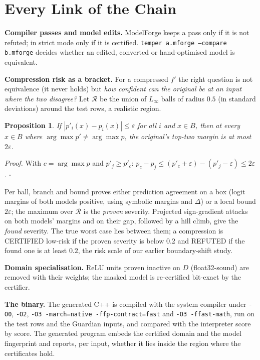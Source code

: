 \documentclass[conference]{IEEEtran}
\newtheorem{proposition}{Proposition}
\begin{document}
\section{Every Link of the Chain}\label{sec:chain}
\textbf{Compiler passes and model edits.} ModelForge keeps a pass only if it is not refuted; in strict mode only if it is certified. \texttt{temper a.mforge --compare b.mforge} decides whether an edited, converted or hand-optimised model is equivalent.

\textbf{Compression risk as a bracket.} For a compressed $f'$ the right question is not equivalence (it never holds) but \emph{how confident can the original be at an input where the two disagree?} Let $\mathcal{R}$ be the union of $L_\infty$ balls of radius $0.5$ (in standard deviations) around the test rows, a realistic region.
\begin{proposition}
If $|p'_i(x)-p_i(x)|\le\varepsilon$ for all $i$ and $x\in B$, then at every $x\in B$ where $\arg\max p'\ne\arg\max p$, the original's top-two margin is at most $2\varepsilon$.
\end{proposition}
\noindent\emph{Proof.} With $c=\arg\max p$ and $p'_j\ge p'_c$: $p_c-p_j\le(p'_c+\varepsilon)-(p'_j-\varepsilon)\le2\varepsilon$. \hfill$\square$

Per ball, branch and bound proves either prediction agreement on a box (logit margins of both models positive, using symbolic margins and $\Delta$) or a local bound $2\varepsilon$; the maximum over $\mathcal{R}$ is the \emph{proven} severity. Projected sign-gradient attacks on both models' margins and on their gap, followed by a hill climb, give the \emph{found} severity. The true worst case lies between them; a compression is CERTIFIED low-risk if the proven severity is below $0.2$ and REFUTED if the found one is at least $0.2$, the risk scale of our earlier boundary-shift study.

\textbf{Domain specialisation.} ReLU units proven inactive on $D$ (float32-sound) are removed with their weights; the masked model is re-certified bit-exact by the certifier.

\textbf{The binary.} The generated C++ is compiled with the system compiler under \texttt{-O0}, \texttt{-O2}, \texttt{-O3 -march=native -ffp-contract=fast} and \texttt{-O3 -ffast-math}, run on the test rows and the Guardian inputs, and compared with the interpreter score by score. The generated program embeds the certified domain and the model fingerprint and reports, per input, whether it lies inside the region where the certificates hold.
\end{document}
